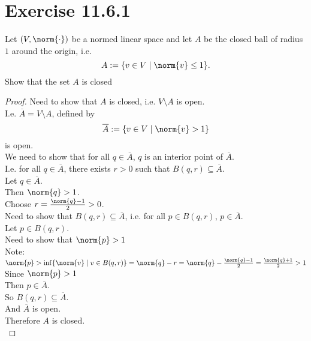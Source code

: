\documentclass[problem]{classnotes}
\begin{document}
    \section{Exercise 11.6.1}
    \begin{problem}
        Let $(V, \norm{\cdot})$ be a normed linear space and let $A$ be the closed ball of radius $1$ around the origin, i.e.
        $$A:=\{v \in V \mid \norm{v} \le 1\}.$$
        Show that the set $A$ is closed
    \end{problem}
    \begin{proof}
        Need to show that $A$ is closed, i.e. $V \setminus A$ is open. \\
        I.e. $\overline{A} = V \setminus A$, defined by
        $$\overline{A} := \{v \in V \mid \norm{v} > 1\}$$
        is open. \\
        We need to show that for all $q \in \overline{A}$, $q$ is an interior point of $\overline{A}$. \\
        I.e. for all $q \in \overline{A}$, there exists $r > 0$ such that $B(q,r) \subseteq \overline{A}$. \\
        Let $q \in \overline{A}$. \\
        Then $\norm{q} > 1$. \\
        Choose $r = \frac{\norm{q}-1}{2} > 0$. \\
        Need to show that $B(q,r) \subseteq \overline{A}$, i.e. for all $p \in B(q,r)$, $p \in \overline{A}$. \\
        Let $p \in B(q,r)$. \\
        Need to show that $\norm{p} > 1$ \\
        Note: $\norm{p} > \inf \{\norm{v} \mid v \in B(q,r)\}= \norm{q}-r = \norm{q}-\frac{\norm{q}-1}{2} = \frac{\norm{q}+1}{2} > 1$\\
        Since $\norm{p} > 1$ \\
        Then $p \in \overline{A}$. \\
        So $B(q,r) \subseteq \overline{A}$. \\
        And $\overline{A}$ is open. \\
        Therefore $A$ is closed. \\




\end{proof}
\end{document}
